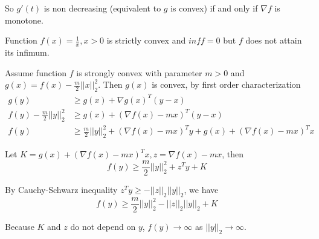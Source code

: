 \documentclass[12pt,letterpaper]{article}
\begin{document}
\begin{alphalist}
    So $g'(t)$ is non decreasing (equivalent to $g$ is convex) if and only if $\nabla f$ is monotone.

\item
    Function $f(x) = \frac{1}{x}, x > 0$ is strictly convex and $inf f = 0$ but
    $f$ does not attain its infimum.

\item
    Assume function $f$ is strongly convex with parameter $m > 0$ and  $g(x) =
    f(x) - \frac{m}{2} ||x||_2^2$. Then $g(x)$ is convex, by first order
    characterization
    \[
        \begin{split}
            g(y) &\ge g(x) + \nabla g(x)^T(y - x) \\
            f(y) - \frac{m}{2}||y||_2^2 &\ge g(x) + (\nabla f(x) - mx)^T(y -
            x)\\
            f(y) &\ge \frac{m}{2}||y||_2^2 + (\nabla f(x) - mx)^Ty + g(x) + (\nabla f(x) - mx)^Tx
        \end{split}
    \]

    Let $K = g(x) + (\nabla f(x) - mx)^Tx, z = \nabla f(x) - mx$, then
    \[
        f(y) \ge \frac{m}{2}||y||_2^2 + z^Ty + K
    \]

    By Cauchy-Schwarz inequality $z^Ty \ge - ||z||_2||y||_2$, we have
    \[
        f(y) \ge \frac{m}{2}||y||_2^2 - ||z||_2 ||y||_2 + K
    \]

    Because $K$ and $z$ do not depend on $y$, $f(y) \to \infty$ as $||y||_2 \to
    \infty$.

\end{alphalist}

\newpage
\end{document}
